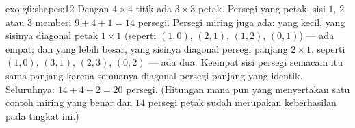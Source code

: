 \begin{solution}{exo:g6:shapes:12}
Dengan $4 \times 4$ titik ada $3 \times 3$ petak. Persegi yang 
petak: sisi $1$, $2$ atau $3$ memberi $9 + 4 + 1 = 14$ persegi.
Persegi miring juga ada: yang kecil, yang sisinya diagonal petak
$1 \times 1$ (seperti $(1,0)$, $(2,1)$, $(1,2)$, $(0,1)$) --- ada
empat; dan yang lebih besar, yang sisinya diagonal persegi panjang
$2 \times 1$, seperti $(1,0)$, $(3,1)$, $(2,3)$, $(0,2)$ --- ada dua.
Keempat sisi persegi semacam itu sama panjang karena semuanya diagonal
persegi panjang yang identik. Seluruhnya: $14 + 4 + 2 = 20$ persegi.
(Hitungan mana pun yang menyertakan satu contoh miring yang benar dan
$14$ persegi  petak sudah merupakan keberhasilan pada tingkat ini.)
\end{solution}

